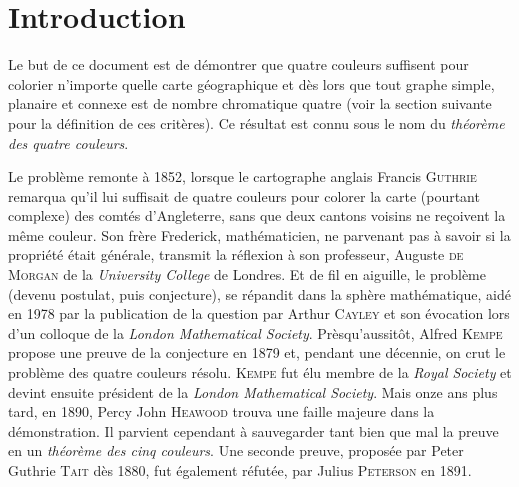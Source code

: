 \documentclass[french]{report}
\begin{document}
	\def \axeline {dotted}
	\def\changemargin#1#2{\list{}{\rightmargin#2\leftmargin#1}\item[]}
	\let\endchangemargin=\endlist 




\newpage
{}

\tableofcontents

\chapter{Introduction}

\setcounter{page}{2}


Le but de ce document est de démontrer que quatre couleurs suffisent pour colorier n'importe quelle carte géographique et dès lors que tout graphe simple, planaire et connexe est de nombre chromatique quatre (voir la section suivante pour la définition de ces critères). Ce résultat est connu sous le nom du \textit{théorème des quatre couleurs}.\bigskip

Le problème remonte à 1852, lorsque le cartographe anglais Francis \textsc{Guthrie} remarqua qu'il lui suffisait de quatre couleurs pour colorer la carte (pourtant complexe) des comtés d'Angleterre, sans que deux cantons voisins ne reçoivent la même couleur. Son frère Frederick, mathématicien, ne parvenant pas à savoir si la propriété était générale, transmit la réflexion à son professeur, Auguste \textsc{de Morgan} de la \textit{University College} de Londres. Et de fil en aiguille, le problème (devenu postulat, puis conjecture), se répandit dans la sphère mathématique, aidé en 1978 par la publication de la question par Arthur \textsc{Cayley} et son évocation lors d'un colloque de la \textit{London Mathematical Society}. Prèsqu'aussitôt, Alfred \textsc{Kempe} propose une preuve de la conjecture en 1879 et, pendant une décennie, on crut le problème des quatre couleurs résolu. \textsc{Kempe} fut élu membre de la \textit{Royal Society} et devint ensuite président de la \textit{London Mathematical Society}. Mais onze ans plus tard, en 1890, Percy John \textsc{Heawood} trouva une faille majeure dans la démonstration. Il parvient cependant à sauvegarder tant bien que mal la preuve en un \textit{théorème des cinq couleurs}. Une seconde preuve, proposée par Peter Guthrie \textsc{Tait} dès 1880, fut également réfutée, par Julius \textsc{Peterson} en 1891.\smallskip
\end{document}
